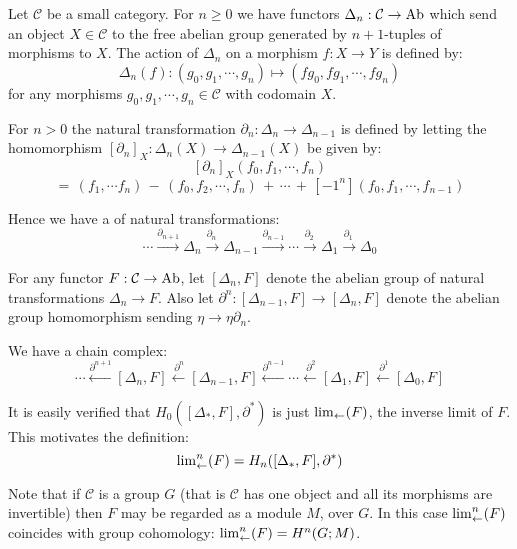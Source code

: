 \documentclass[12pt]{article}
\begin{document}
Let $\mathcal{C}$ be a small category.  For $n \geq 0$ we have functors $\Delta_n: \mathcal{C}\to{\rm Ab}$ which send an object $X \in \mathcal{C}$ to the free abelian group generated by $n+1$-tuples of morphisms to $X$.  The action of $\Delta_n$ on a morphism $f:X \to Y$ is defined by: $$\Delta_n(f): (g_0,g_1,\cdots, g_n) \mapsto (fg_0,fg_1,\cdots,fg_n)$$ for any morphisms $g_0,g_1, \cdots,g_n \in \mathcal{C}$ with codomain $X$.

For $n>0$ the natural transformation $\partial_n:\Delta_n \to \Delta_{n-1}$ is defined by letting the homomorphism $[\partial_n]_X:\Delta_n(X) \to \Delta_{n-1}(X)$ be given by:  $$[\partial_n]_X (f_0,f_1,\cdots,f_n)$$$$=\,(f_1,\cdots f_n)\,-\,(f_0,f_2,\cdots,f_n)\,+\,\cdots\,+\,[-1^n](f_0,f_1,\cdots,f_{n-1})$$

Hence we have a  of natural transformations:$$
\cdots \stackrel{\partial_{n+1}}\to \Delta_n \stackrel{\partial_n\,}\to \Delta_{n-1} \stackrel{\partial_{n-1}}\to \cdots \stackrel{\partial_{2}\,}\to \Delta_1 \stackrel{\partial_1\,}\to \Delta_{0}$$

For any functor $F:\mathcal{C} \to {\rm Ab}$, let $[\Delta_n,F]$ denote the abelian group of natural transformations $\Delta_n \to F$.  Also let $\partial^n:[\Delta_{n-1},F] \to [\Delta_n,F]$ denote the abelian group homomorphism sending $\eta \to \eta \partial_n$.

We have a chain complex:$$
\cdots \stackrel{\partial^{n+1}}\leftarrow [\Delta_{n},F] \stackrel{\,\partial^n}\leftarrow [\Delta_{n-1},F] \stackrel{\partial^{n-1}}\leftarrow \cdots \stackrel{\,\partial^{2}}\leftarrow [\Delta_{1},F] \stackrel{\,\partial^1}\leftarrow [\Delta_{0},F]$$

It is easily verified that $H_0([\Delta_{*},F],\partial^*)$ is just $ {\rm lim}_{\leftarrow}(F)$, the inverse limit of $F$.  This motivates the definition:$$ {\rm lim}^n_{\leftarrow}(F)=H_n([\Delta_{*},F],\partial^*)$$

Note that if $\mathcal{C}$ is a group $G$ (that is $\mathcal{C}$ has one object and all its morphisms are invertible) then $F$ may be regarded as a module $M$, over $G$.  In this case ${\rm lim}^n_{\leftarrow}(F)$ coincides with group cohomology:  $ {\rm lim}^n_{\leftarrow}(F)=H^n(G;M) $.
\end{document}

